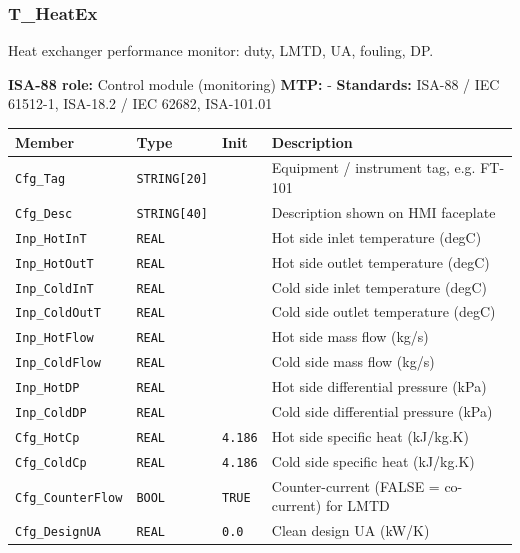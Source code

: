 \subsubsection*{T\_HeatEx}
\label{app:pclib:theatex}
Heat exchanger performance monitor: duty, LMTD, UA, fouling, DP.

{\small\textbf{ISA-88 role:} Control module (monitoring) \quad \textbf{MTP:} - \quad \textbf{Standards:} ISA-88 /\allowbreak{} IEC 61512-1, ISA-18.2 /\allowbreak{} IEC 62682, ISA-101.01}
{\footnotesize
\begin{longtable}{@{}>{\raggedright\arraybackslash}p{3.4cm}>{\raggedright\arraybackslash}p{3.3cm}>{\raggedright\arraybackslash}p{1.3cm}>{\raggedright\arraybackslash}p{6.4cm}@{}}
\toprule
\rowcolor{tblhead}\textbf{Member} & \textbf{Type} & \textbf{Init} & \textbf{Description} \\
\midrule
\endhead
\texttt{Cfg\_Tag} & \texttt{STRING[20]} &  & Equipment /\allowbreak{} instrument tag, e.g. FT-101 \\
\texttt{Cfg\_Desc} & \texttt{STRING[40]} &  & Description shown on HMI faceplate \\
\texttt{Inp\_HotInT} & \texttt{REAL} &  & Hot side inlet temperature (degC) \\
\texttt{Inp\_HotOutT} & \texttt{REAL} &  & Hot side outlet temperature (degC) \\
\texttt{Inp\_ColdInT} & \texttt{REAL} &  & Cold side inlet temperature (degC) \\
\texttt{Inp\_ColdOutT} & \texttt{REAL} &  & Cold side outlet temperature (degC) \\
\texttt{Inp\_HotFlow} & \texttt{REAL} &  & Hot side mass flow (kg/\allowbreak{}s) \\
\texttt{Inp\_ColdFlow} & \texttt{REAL} &  & Cold side mass flow (kg/\allowbreak{}s) \\
\texttt{Inp\_HotDP} & \texttt{REAL} &  & Hot side differential pressure (kPa) \\
\texttt{Inp\_ColdDP} & \texttt{REAL} &  & Cold side differential pressure (kPa) \\
\texttt{Cfg\_HotCp} & \texttt{REAL} & \texttt{4.186} & Hot side specific heat (kJ/\allowbreak{}kg.K) \\
\texttt{Cfg\_ColdCp} & \texttt{REAL} & \texttt{4.186} & Cold side specific heat (kJ/\allowbreak{}kg.K) \\
\texttt{Cfg\_CounterFlow} & \texttt{BOOL} & \texttt{TRUE} & Counter-current (FALSE = co-current) for LMTD \\
\texttt{Cfg\_DesignUA} & \texttt{REAL} & \texttt{0.0} & Clean design UA (kW/\allowbreak{}K) \\

\end{longtable}}
